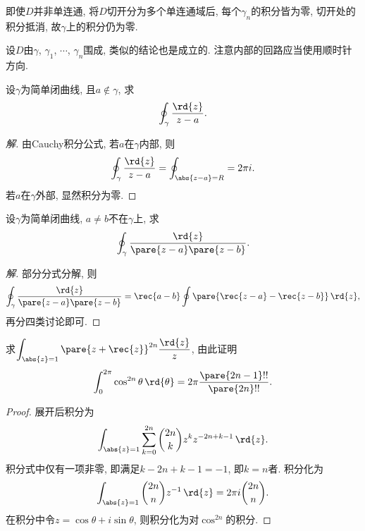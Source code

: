 \documentclass[../ComplexVariable.tex]{subfiles}
\begin{document}
\begin{remark}
    即使$D$并非单连通, 将$D$切开分为多个单连通域后, 每个$\gamma_n$的积分皆为零, 切开处的积分抵消, 故$\gamma$上的积分仍为零.
\end{remark}
\begin{remark}
    设$D$由$\gamma$, $\gamma_1$, $\cdots$, $\gamma_n$围成, 类似的结论也是成立的. 注意内部的回路应当使用顺时针方向.
\end{remark}
\begin{sample}
    \begin{ex}
        设$\gamma$为简单闭曲线, 且$a\notin \gamma$, 求
        \[ \oint_\gamma \frac{\rd{z}}{z-a}. \]
    \end{ex}
    \begin{proof}[解]
        由Cauchy积分公式, 若$a$在$\gamma$内部, 则
        \[ \oint_\gamma \frac{\rd{z}}{z-a} = \oint_{\abs{z-a} = R} = 2\pi i. \]
        若$a$在$\gamma$外部, 显然积分为零.
    \end{proof}
\end{sample}
\begin{sample}
    \begin{ex}
        设$\gamma$为简单闭曲线, $a\neq b$不在$\gamma$上, 求
        \[ \oint_\gamma \frac{\rd{z}}{\pare{z-a}\pare{z-b}}. \]
    \end{ex}
    \begin{proof}[解]
        部分分式分解, 则
        \[ \oint_\gamma \frac{\rd{z}}{\pare{z-a}\pare{z-b}} = \rec{a-b}\oint\pare{\rec{z-a} - \rec{z-b}}\,\rd{z}, \]
        再分四类讨论即可.
    \end{proof}
\end{sample}
\begin{sample}
    \begin{ex}
        求$\displaystyle \int_{\abs{z}=1} \pare{z+\rec{z}}^{2n}\frac{\rd{z}}{z}$, 由此证明
        \[ \int_0^{2\pi} \cos^{2n} \theta\,\rd{\theta} = 2\pi \frac{\pare{2n-1}!!}{\pare{2n}!!}. \]
    \end{ex}
    \begin{proof}
        展开后积分为
        \[ \int_{\abs{z}=1} \sum_{k=0}^{2n} \binom{2n}{k}z^k z^{-2n +k-1} \,\rd{z}. \]
        积分式中仅有一项非零, 即满足$k-2n+k-1=-1$, 即$k=n$者. 积分化为
        \[ \int_{\abs{z}=1}\binom{2n}{n}z^{-1}\,\rd{z} = 2\pi i \binom{2n}{n}. \]
        在积分中令$z=\cos\theta + i\sin\theta$, 则积分化为对$\cos^{2n}$的积分.
    \end{proof}
\end{sample}

\end{document}
